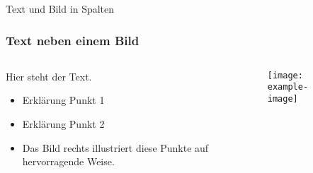 \begin{frame}{Text und Bild in Spalten}
    \frametitle{Text neben einem Bild}
    
    \begin{columns}[c] %
        \begin{column}{0.6\textwidth}
            Hier steht der Text.
            \begin{itemize}
                \item Erklärung Punkt 1
                \item Erklärung Punkt 2
                \item Das Bild rechts illustriert diese Punkte auf hervorragende Weise.
            \end{itemize}
        \end{column}
        
        \begin{column}{0.4\textwidth}
            \begin{figure}
                \texttt{[image: example-image]}
            \end{figure}
        \end{column}
    \end{columns}
\end{frame}

